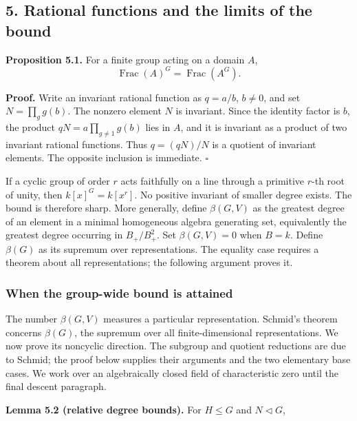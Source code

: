 \documentclass[
]{article}
\begin{document}
\subsection{5. Rational functions and the limits of the
bound}\label{rational-functions-and-the-limits-of-the-bound}

\protect{}\label{proposition-5-1}{}

\textbf{Proposition 5.1.} For a finite group acting on a domain \(A\),
\[
\operatorname{Frac}(A)^G=\operatorname{Frac}(A^G).
\]

\textbf{Proof.} Write an invariant rational function as \(q=a/b\),
\(b\ne0\), and set \(N=\prod_g g(b)\). The nonzero element \(N\) is
invariant. Since the identity factor is \(b\), the product
\(qN=a\prod_{g\ne1}g(b)\) lies in \(A\), and it is invariant as a
product of two invariant rational functions. Thus \(q=(qN)/N\) is a
quotient of invariant elements. The opposite inclusion is immediate.
\(\square\)

If a cyclic group of order \(r\) acts faithfully on a line through a
primitive \(r\)-th root of unity, then \(k [x]^G=k [x^r]\). No positive
invariant of smaller degree exists. The bound is therefore sharp. More
generally, define \(\beta(G,V)\) as the greatest degree of an element in
a minimal homogeneous algebra generating set, equivalently the greatest
degree occurring in \(B_+/B_+^2\). Set \(\beta(G,V)=0\) when \(B=k\).
Define \(\beta(G)\) as its supremum over representations. The equality
case requires a theorem about all representations; the following
argument proves it.

\subsubsection{When the group-wide bound is
attained}\label{when-the-group-wide-bound-is-attained}

The number \(\beta(G,V)\) measures a particular representation. Schmid's
theorem concerns \(\beta(G)\), the supremum over all finite-dimensional
representations. We now prove its noncyclic direction. The subgroup and
quotient reductions are due to Schmid; the proof below supplies their
arguments and the two elementary base cases. We work over an
algebraically closed field of characteristic zero until the final
descent paragraph.

\protect{}\label{lemma-5-2}{}

\textbf{Lemma 5.2 (relative degree bounds).} For \(H\leq G\) and
\(N\triangleleft G\), \protect{}\label{equation-S1}{}
\end{document}
